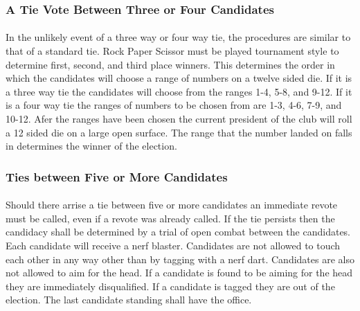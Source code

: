 \documentclass[12pt]{article}
\begin{document}
\subsubsection {A Tie Vote Between Three or Four Candidates}
\paragraph{}
In the unlikely event of a three way or four way tie, the procedures are similar to that of a standard tie. Rock Paper Scissor must be played tournament style to determine first, second, and third place winners. This determines the order in which the candidates will choose a range of numbers on a twelve sided die. If it is a three way tie the candidates will choose from the ranges 1-4, 5-8, and 9-12. If it is a four way tie the ranges of numbers to be chosen from are 1-3, 4-6, 7-9, and 10-12. Afer the ranges have been chosen the current president of the club will roll a 12 sided die on a large open surface. The range that the number landed on falls in determines the winner of the election.

\subsubsection{Ties between Five or More Candidates}
\paragraph{}
Should there arrise a tie between five or more candidates an immediate revote must be called, even if a revote was already called. 
If the tie persists then the candidacy shall be determined by a trial of open combat between the candidates. 
Each candidate will receive a nerf blaster. 
Candidates are not allowed to touch each other in any way other than by tagging with a nerf dart.
Candidates are also not allowed to aim for the head. If a candidate is found to be aiming for the
head they are immediately disqualified. 
If a candidate is tagged they are out of the election. The last candidate standing shall have the office.



\end{document}
